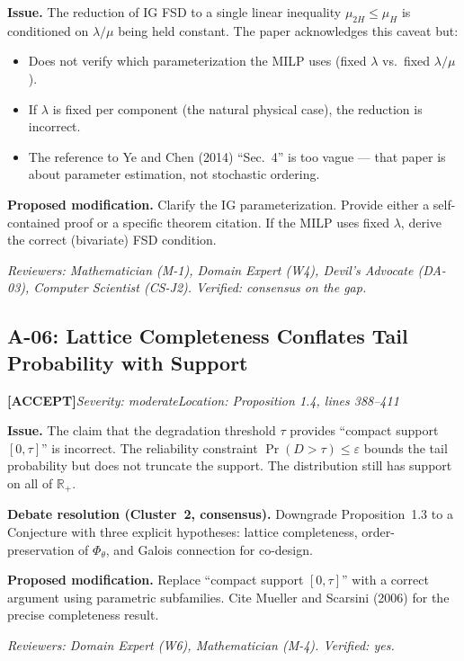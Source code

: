 \documentclass[11pt,a4paper]{article}
\newcommand{\acceptlabel}{\textbf{\textcolor{acceptgreen}{[ACCEPT]}}}
\begin{document}
\textbf{Issue.} The reduction of IG FSD to a single linear inequality $\mu_{2H}\le\mu_H$ is conditioned on $\lambda/\mu$ being held constant. The paper acknowledges this caveat but:
\begin{itemize}[nosep,leftmargin=1.5em]
  \item Does not verify which parameterization the MILP uses (fixed $\lambda$ vs.\ fixed $\lambda/\mu$).
  \item If $\lambda$ is fixed per component (the natural physical case), the reduction is incorrect.
  \item The reference to Ye and Chen (2014) ``Sec.~4'' is too vague --- that paper is about parameter estimation, not stochastic ordering.
\end{itemize}

\textbf{Proposed modification.} Clarify the IG parameterization. Provide either a self-contained proof or a specific theorem citation. If the MILP uses fixed $\lambda$, derive the correct (bivariate) FSD condition.

\textit{Reviewers: Mathematician (M-1), Domain Expert (W4), Devil's Advocate (DA-03), Computer Scientist (CS-J2). Verified: consensus on the gap.}

\bigskip

\subsection{A-06: Lattice Completeness Conflates Tail Probability with Support}
\acceptlabel\quad\textit{Severity: moderate}\quad\textit{Location: Proposition 1.4, lines 388--411}

\textbf{Issue.} The claim that the degradation threshold $\tau$ provides ``compact support $[0,\tau]$'' is incorrect. The reliability constraint $\Pr(D>\tau)\le\varepsilon$ bounds the tail probability but does not truncate the support. The distribution still has support on all of $\mathbb{R}_+$.

\textbf{Debate resolution (Cluster~2, consensus).} Downgrade Proposition~1.3 to a Conjecture with three explicit hypotheses: lattice completeness, order-preservation of $\Phi_\theta$, and Galois connection for co-design.

\textbf{Proposed modification.} Replace ``compact support $[0,\tau]$'' with a correct argument using parametric subfamilies. Cite Mueller and Scarsini (2006) for the precise completeness result.

\textit{Reviewers: Domain Expert (W6), Mathematician (M-4). Verified: yes.}
\end{document}
